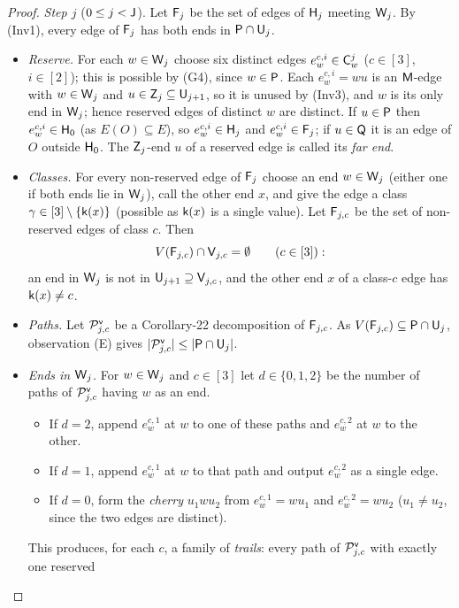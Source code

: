 \begin{proof}
\emph{Step $j$} ($0\le j<\mathsf{J}$). Let $\mathsf{F}_j$ be the set of edges of $\mathsf{H}_j$ meeting $\mathsf{W}_j$. By (Inv1), every edge of
$\mathsf{F}_j$ has both ends in $\mathsf{P}\cap\mathsf{U}_j$.
\begin{itemize}
\item[(i)] \emph{Reserve.} For each $w\in\mathsf{W}_j$ choose six distinct edges $e^{c,i}_w\in\mathsf{C}^j_w$ ($c\in[3]$,
  $i\in[2]$); this is possible by (G4), since $w\in\mathsf{P}$. Each $e^{c,i}_w=wu$ is an $\mathsf{M}$-edge with $w\in\mathsf{W}_j$ and
  $u\in\mathsf{Z}_j\subseteq\mathsf{U}_{j+1}$, so it is unused by (Inv3), and $w$ is its only end in $\mathsf{W}_j$; hence reserved
  edges of distinct $w$ are distinct. If $u\in\mathsf{P}$ then $e^{c,i}_w\in\mathsf{H}_0$ (as $E(O)\subseteq E$), so
  $e^{c,i}_w\in\mathsf{H}_j$ and $e^{c,i}_w\in\mathsf{F}_j$; if $u\in\mathsf{Q}$ it is an edge of $O$ outside $\mathsf{H}_0$. The $\mathsf{Z}_j$-end $u$
  of a reserved edge is called its \emph{far end}.
\item[(ii)] \emph{Classes.} For every non-reserved edge of $\mathsf{F}_j$ choose an end $w\in\mathsf{W}_j$ (either one if both ends
  lie in $\mathsf{W}_j$), call the other end $x$, and give the edge a class $\gamma\in[3]\setminus\{\mathsf{k}(x)\}$ (possible as
  $\mathsf{k}(x)$ is a single value). Let $\mathsf{F}_{j,c}$ be the set of non-reserved edges of class $c$. Then
  \begin{equation}\label{s4:eqTPVclass}
  V(\mathsf{F}_{j,c})\cap\mathsf{V}_{j,c}=\emptyset\qquad(c\in[3]):
  \end{equation}
  an end in $\mathsf{W}_j$ is not in $\mathsf{U}_{j+1}\supseteq\mathsf{V}_{j,c}$, and the other end $x$ of a class-$c$ edge has
  $\mathsf{k}(x)\ne c$.
\item[(iii)] \emph{Paths.} Let $\mathcal{P}^{\mathsf{v}}_{j,c}$ be a Corollary-22 decomposition of $\mathsf{F}_{j,c}$. As
  $V(\mathsf{F}_{j,c})\subseteq\mathsf{P}\cap\mathsf{U}_j$, observation \textup{(E)} gives $|\mathcal{P}^{\mathsf{v}}_{j,c}|\le|\mathsf{P}\cap\mathsf{U}_j|$.
\item[(iv)] \emph{Ends in $\mathsf{W}_j$.} For $w\in\mathsf{W}_j$ and $c\in[3]$ let $d\in\{0,1,2\}$ be the number of paths of
  $\mathcal{P}^{\mathsf{v}}_{j,c}$ having $w$ as an end.
  \begin{itemize}
  \item If $d=2$, append $e^{c,1}_w$ at $w$ to one of these paths and $e^{c,2}_w$ at $w$ to the other.
  \item If $d=1$, append $e^{c,1}_w$ at $w$ to that path and output $e^{c,2}_w$ as a single edge.
  \item If $d=0$, form the \emph{cherry} $u_1wu_2$ from $e^{c,1}_w=wu_1$ and $e^{c,2}_w=wu_2$ ($u_1\ne u_2$, since the
    two edges are distinct).
  \end{itemize}
  This produces, for each $c$, a family of \emph{trails}: every path of $\mathcal{P}^{\mathsf{v}}_{j,c}$ with exactly one reserved

\end{itemize}
\end{proof}
